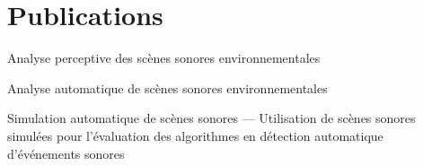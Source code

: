 \chapter*{Publications}




Analyse perceptive des scènes sonores environnementales \\ \medskip

\begin{refsection}

    \small
    \nocite{*} %
    \printbibliography[heading=none]
    
\end{refsection}


\vfill
Analyse automatique de scènes sonores environnementales\\ \medskip

\begin{refsection}[ownpubs_ml]

    \small
    \nocite{*} %
    \printbibliography[heading=none]
    
\end{refsection}
\vfill

\newpage
\vfill
Simulation automatique de scènes sonores --- Utilisation de scènes sonores simulées pour l'évaluation des algorithmes en détection automatique d'événements sonores\\ \medskip

\begin{refsection}

    \small
    \nocite{*} %
    \printbibliography[heading=none]
    
\end{refsection}